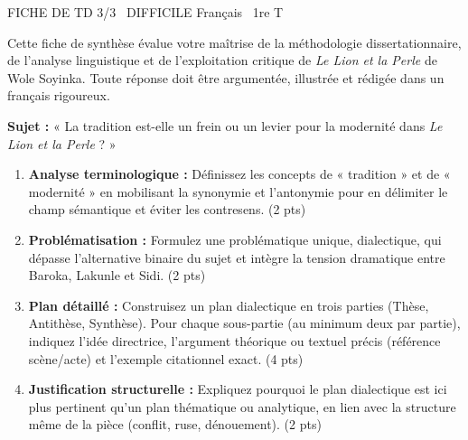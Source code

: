 \documentclass[11pt]{article}
\begin{document}
\begin{tcolorbox}[enhanced,colback=popink,colframe=popink,arc=10pt,boxrule=0pt,left=12pt,right=12pt,top=9pt,bottom=9pt]
{\color{white}\popxbold\small FICHE DE TD 3/3 \textbullet\ DIFFICILE \hfill Français \textbullet\ 1re T\par}
\end{tcolorbox}
\vspace{4pt}
\noindent Cette fiche de synthèse évalue votre maîtrise de la méthodologie dissertationnaire, de l'analyse linguistique et de l'exploitation critique de \textit{Le Lion et la Perle} de Wole Soyinka. Toute réponse doit être argumentée, illustrée et rédigée dans un français rigoureux.

\begin{exercice}
\textbf{Sujet :} « La tradition est-elle un frein ou un levier pour la modernité dans \textit{Le Lion et la Perle} ? »

\begin{enumerate}
    \item \textbf{Analyse terminologique :} Définissez les concepts de « tradition » et de « modernité » en mobilisant la synonymie et l'antonymie pour en délimiter le champ sémantique et éviter les contresens. (2 pts)
    \item \textbf{Problématisation :} Formulez une problématique unique, dialectique, qui dépasse l'alternative binaire du sujet et intègre la tension dramatique entre Baroka, Lakunle et Sidi. (2 pts)
    \item \textbf{Plan détaillé :} Construisez un plan dialectique en trois parties (Thèse, Antithèse, Synthèse). Pour chaque sous-partie (au minimum deux par partie), indiquez l'idée directrice, l'argument théorique ou textuel précis (référence scène/acte) et l'exemple citationnel exact. (4 pts)
    \item \textbf{Justification structurelle :} Expliquez pourquoi le plan dialectique est ici plus pertinent qu'un plan thématique ou analytique, en lien avec la structure même de la pièce (conflit, ruse, dénouement). (2 pts)
\end{enumerate}
\end{exercice}
\end{document}
